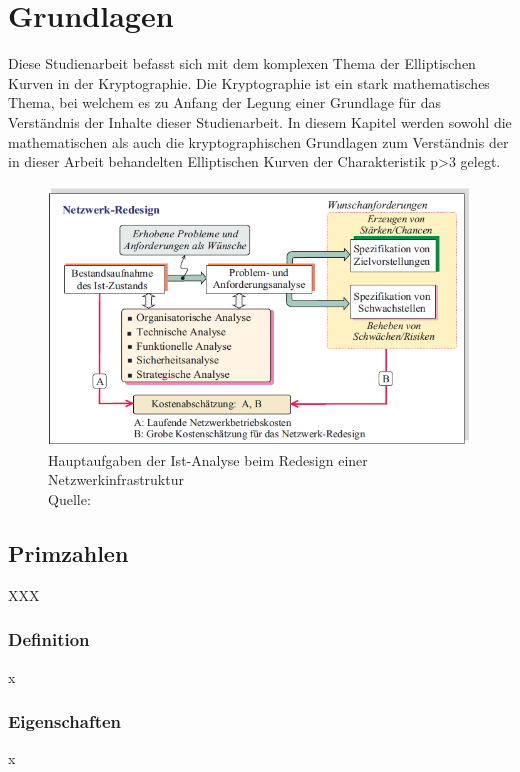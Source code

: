 \chapter{Grundlagen}
Diese Studienarbeit befasst sich mit dem komplexen Thema der Elliptischen Kurven in der Kryptographie. Die Kryptographie ist ein stark mathematisches Thema, bei welchem es zu Anfang der Legung einer Grundlage für das Verständnis der Inhalte dieser Studienarbeit. In diesem Kapitel werden sowohl die mathematischen als auch die kryptographischen Grundlagen zum Verständnis der in dieser Arbeit behandelten Elliptischen Kurven der Charakteristik p>3 gelegt. \cite[vgl.][S. 10]{it_sicherheit}

\begin{figure}[!h]
\centering
\includegraphics[width=\textwidth]{grafiken/aufgaben_redesign.png}
\caption[Hauptaufgaben der Ist-Analyse beim Redesign einer Netzwerkinfrastruktur]{Hauptaufgaben der Ist-Analyse beim Redesign einer Netzwerkinfrastruktur \\ Quelle: \cite[vgl.][S. 69]{netzwerkprojekte}}
\label{fig:aufgaben_redesign}
\end{figure}

\section{Primzahlen}
XXX

\subsection{Definition}
x

\subsection{Eigenschaften}
x

